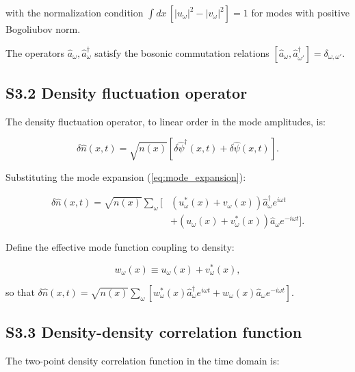 \documentclass[prd,aps,showpacs,superscriptaddress,twocolumn]{revtex4-2}
\begin{document}
with the normalization condition $\int dx \, [|u_\omega|^2 - |v_\omega|^2] = 1$ for modes with positive Bogoliubov norm.

The operators $\hat{a}_\omega, \hat{a}_\omega^\dagger$ satisfy the bosonic commutation relations $[\hat{a}_\omega, \hat{a}_{\omega'}^\dagger] = \delta_{\omega,\omega'}$.

\subsection{S3.2 Density fluctuation operator}

The density fluctuation operator, to linear order in the mode amplitudes, is:

\begin{equation}
\delta\hat{n}(x,t) = \sqrt{n(x)} \left[ \delta\hat{\psi}^\dagger(x,t) + \delta\hat{\psi}(x,t) \right].
\label{eq:dn_operator}
\end{equation}

Substituting the mode expansion (\ref{eq:mode_expansion}):

\begin{align}
\delta\hat{n}(x,t) = \sqrt{n(x)} \sum_\omega \Big[ &(u_\omega^*(x) + v_\omega(x)) \hat{a}_\omega^\dagger e^{i\omega t} \nonumber\\
&+ (u_\omega(x) + v_\omega^*(x)) \hat{a}_\omega e^{-i\omega t} \Big].
\label{eq:dn_expanded}
\end{align}

Define the effective mode function coupling to density:

\begin{equation}
w_\omega(x) \equiv u_\omega(x) + v_\omega^*(x),
\label{eq:w_definition}
\end{equation}

so that $\delta\hat{n}(x,t) = \sqrt{n(x)} \sum_\omega [ w_\omega^*(x) \hat{a}_\omega^\dagger e^{i\omega t} + w_\omega(x) \hat{a}_\omega e^{-i\omega t} ]$.

\subsection{S3.3 Density-density correlation function}

The two-point density correlation function in the time domain is:
\end{document}
